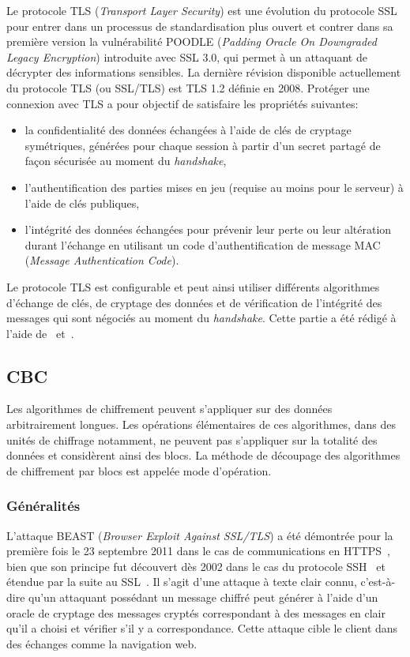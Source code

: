 \documentclass[a4paper,twoside]{article}
\begin{document}
Le protocole TLS (\emph{Transport Layer Security}) est une évolution du protocole
SSL pour entrer dans un processus de standardisation plus ouvert et contrer
dans sa première version la vulnérabilité POODLE (\emph{Padding Oracle On
Downgraded Legacy Encryption}) introduite avec SSL 3.0, qui permet à un
attaquant de décrypter des informations sensibles. La dernière révision
disponible actuellement du protocole TLS (ou SSL/TLS) est TLS 1.2 définie en
2008. Protéger une connexion avec TLS a pour objectif de satisfaire les
propriétés suivantes:

\begin{itemize}
    \item la confidentialité des données échangées à l'aide de clés de
	cryptage symétriques, générées pour chaque session à partir d'un
	secret partagé de façon sécurisée au moment du \emph{handshake},
    \item l'authentification des parties mises en jeu (requise au moins
	pour le serveur) à l'aide de clés publiques,
    \item l'intégrité des données échangées pour prévenir leur perte ou leur
	altération durant l'échange en utilisant un code d'authentification
	de message MAC (\emph{Message Authentication Code}).
\end{itemize}

Le protocole TLS est configurable et peut ainsi utiliser différents
algorithmes d'échange de clés, de cryptage des données et de vérification de
l'intégrité des messages qui sont négociés au moment du \emph{handshake}.
Cette partie a été rédigé à l'aide de~\cite{Kaufman:2002:NSP}
et~\cite{Wikipedia:TLS}.

\subsection{CBC}

Les algorithmes de chiffrement peuvent s'appliquer sur des données
arbitrairement longues. Les opérations élémentaires de ces algorithmes, dans
des unités de chiffrage notamment, ne peuvent pas s'appliquer sur la
totalité des données et considèrent ainsi des blocs. La méthode de découpage
des algorithmes de chiffrement par blocs est appelée mode d'opération.

\subsubsection{Généralités}

L'attaque BEAST (\emph{Browser Exploit Against SSL/TLS}) a été démontrée
pour la première fois le 23 septembre 2011 dans le cas de communications en
HTTPS~\cite{Thai:2011:XOR}, bien que son principe fut découvert dès 2002
dans le cas du protocole SSH~\cite{Bellare:2002:AES} et étendue par la
suite au SSL~\cite{Bard:2004:SSL}. Il s'agit d'une attaque à texte clair
connu, c'est-à-dire qu'un attaquant possédant un message chiffré peut
générer à l'aide d'un oracle de cryptage des messages cryptés correspondant
à des messages en clair qu'il a choisi et vérifier s'il y a correspondance.
Cette attaque cible le client dans des échanges comme la navigation web.
\end{document}
